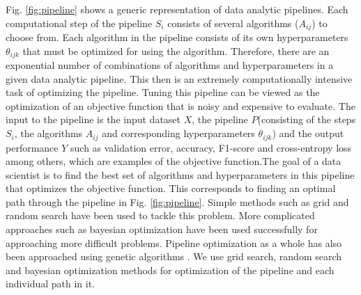 Fig. \ref{fig:pipeline} shows a generic representation of data analytic pipelines. Each computational step of the pipeline $S_{i}$ consists of several algorithms ($A_{ij}$) to choose from. Each algorithm in the pipeline consists of its own hyperparameters $\theta_{ijk}$ that must be optimized for using the algorithm. Therefore, there are an exponential number of combinations of algorithms and hyperparameters in a given data analytic pipeline. This then is an extremely computationally intensive task of optimizing the pipeline. Tuning this pipeline can be viewed as the optimization of an objective function that is noisy and expensive to evaluate. The input to the pipeline is the input dataset $X$, the pipeline $P$(consisting of the steps $S_{i}$, the algorithms $A_{ij}$ and corresponding hyperparameters $\theta_{ijk}$) and the output performance $Y$ such as validation error, accuracy, F1-score and cross-entropy loss among others, which are examples of the objective function.The goal of a data scientist is to find the best set of algorithms and hyperparameters in this pipeline that optimizes the objective function. This corresponds to finding an optimal path through the pipeline in Fig. \ref{fig:pipeline}.  Simple methods such as grid and random search \cite{bergstra2012random} have been used to tackle this problem. More complicated approaches such as bayesian optimization \cite{snoek2012practical, zhang2016flash} have been used successfully for approaching more difficult problems. Pipeline optimization as a whole has also been approached using genetic algorithms \cite{olson2016evaluation, olson2016tpot}.
We use grid search, random search and bayesian optimization methods for optimization of the pipeline and each individual path in it.  

